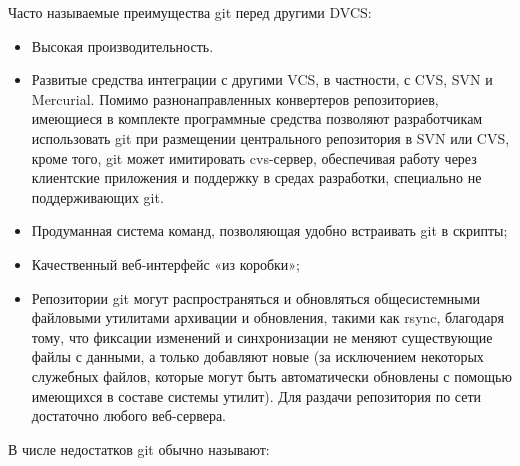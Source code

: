   Часто называемые преимущества git перед другими DVCS:
\begin{itemize}
  \item Высокая производительность.
  \item Развитые средства интеграции с другими VCS, в частности, с CVS, SVN и Mercurial. Помимо разнонаправленных конвертеров репозиториев, имеющиеся в комплекте программные средства позволяют разработчикам использовать git при размещении центрального репозитория в SVN или CVS, кроме того, git может имитировать cvs-сервер, обеспечивая работу через клиентские приложения и поддержку в средах разработки, специально не поддерживающих git.
  \item Продуманная система команд, позволяющая удобно встраивать git в скрипты;
  \item Качественный веб-интерфейс «из коробки»;
  \item Репозитории git могут распространяться и обновляться общесистемными файловыми утилитами архивации и обновления, такими как rsync, благодаря тому, что фиксации изменений и синхронизации не меняют существующие файлы с данными, а только добавляют новые (за исключением некоторых служебных файлов, которые могут быть автоматически обновлены с помощью имеющихся в составе системы утилит). Для раздачи репозитория по сети достаточно любого веб-сервера.
\end{itemize}
 В числе недостатков git обычно называют:
